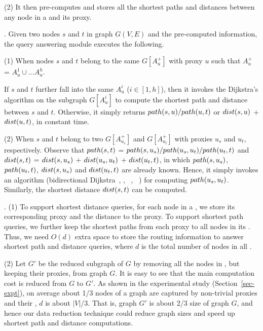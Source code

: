 \sstab (2) It then pre-computes and stores all the shortest paths and distances between any node in a \dra and its proxy.


. Given two nodes $s$ and $t$ in graph $G(V, E)$  and the pre-computed information, the query answering module executes the following.


\sstab (1) When nodes $s$ and $t$ belong to the same \dra $G[A^+_u]$ with proxy $u$ such that $A^+_u$ = $A^1_u\cup\ldots A^h_u$.

If $s$ and $t$ further fall into the same $A^i_u$ ($i\in[1,h]$), then it invokes the Dijkstra's algorithm on the subgraph $G[A^i_u]$ to compute the shortest path and distance between $s$ and $t$. Otherwise, it simply returns $\path(s, u)/\path(u, t)$ or $\dist(s, u)$ + $\dist(u, t)$, in constant time.

\sstab (2)  When $s$ and $t$ belong to two \dras $G[A^+_{u_s}]$ and $G[A^+_{u_t}]$ with proxies $u_s$ and $u_t$, respectively.
%
Observe that $\path(s, t)$ = $\path(s, u_s)/\path(u_s, u_t)/\path(u_t, t)$ and $\dist(s, t)$ = $\dist(s, u_s)$ + $\dist(u_s, u_t)$ + $\dist(u_t, t)$, in which $\path(s, u_s)$, $\path(u_t, t)$, $\dist(s, u_s)$ and $\dist(u_t, t)$ are already known. Hence, it simply invokes an algorithm (\eg bidirectional Dijkstra~\cite{LubyR89}, \arcflag \cite{MohringSSWW05}, \ch~\cite{GeisbergerSSD08}, \tnr~\cite{bast2014route}) for computing $\path(u_s, u_t)$.
Similarly, the shortest distance $\dist(s, t)$ can be computed.

.
(1) To support shortest distance queries, for each node in a \dra, we store its corresponding proxy and the distance to the proxy. To support shortest path queries, we further keep the shortest paths from each proxy to all nodes in its \dra. Thus, we need $O(d)$ extra space to store the routing information to answer shortest path and distance queries, where $d$ is the total number of nodes in all \dras.

\sstab (2) Let $G'$ be the reduced subgraph of $G$ by removing all the nodes in \dras, but keeping their proxies, from graph $G$. It is easy to see that the main computation cost is reduced from $G$ to $G'$. As shown in the experimental study (Section~\ref{sec-expt}), on average about 1/3 nodes of a graph are captured by non-trivial proxies and their \dras, \ie $d$ is about $|V|/3$. That is, graph $G'$ is about 2/3 size of graph $G$, and hence our data reduction technique could reduce graph sizes and speed up shortest path and distance computations. 